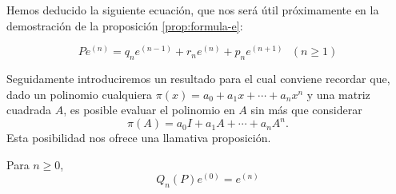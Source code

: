     Hemos deducido la siguiente ecuación, que nos será útil próximamente en la demostración de la proposición \ref{prop:formula-e}:

    \begin{equation}
        \label{eq:Pen}
        Pe^{(n)} =  q_n e^{(n-1)} + r_n  e^{(n)} + p_n e^{(n+1)} \ \ \ (n\geq 1)
    \end{equation}

    Seguidamente introduciremos un resultado para el cual conviene recordar que, dado un polinomio cualquiera $\pi(x)= a_0 + a_1 x + \cdots + a_n x^n$ y una matriz cuadrada $A$, es posible evaluar el polinomio en $A$ sin más que considerar
    $$
    \pi(A) = a_0 I + a_1 A + \cdots + a_n A^n.
    $$
    Esta posibilidad nos ofrece una llamativa proposición.

    \begin{proposicion}
        \label{prop:formula-e}
        Para $n\geq 0$,
        \begin{equation}
            Q_n(P)e^{(0)} = e^{(n)}
        \end{equation}
    \end{proposicion}
